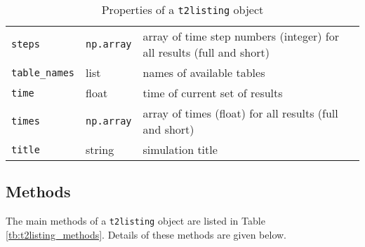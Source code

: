 \begin{table}
\begin{center}
\begin{tabular}{|l|l|p{70mm}|}
      \texttt{steps} & \texttt{np.array} & array of time step numbers (integer) for all results (full and short)\\
      \texttt{table\_names} & list & names of available tables\\
      \texttt{time} & float & time of current set of results\\
      \texttt{times} & \texttt{np.array} & array of times (float) for all results (full and short)\\
      \texttt{title} & string & simulation title\\
      \hline
    \end{tabular}
    \caption{Properties of a \texttt{t2listing} object}
    \label{tb:t2listing_properties}
  \end{center}
\end{table}

\subsection{Methods}
\label{t2listingmethods}

The main methods of a \texttt{t2listing} object are listed in Table \ref{tb:t2listing_methods}.  Details of these methods are given below.

